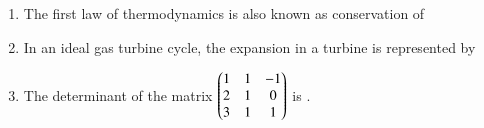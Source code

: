 \documentclass[journal,12pt,onecolumn]{IEEEtran}
\theoremstyle{remark}
\begin{document}
\begin{enumerate}
    [r] Closed-section box beam configuration is capable of resisting torsional loads.
    \hfill{}

    \begin{enumerate}
        \item Both [a] and [r] are true and [r] is the correct reason for [a].
        \item Both [a] and [r] are true but [r] is not the correct reason for [a].
        \item Both [a] and [r] are false.
        \item [a] is true but [r] is false.
    \end{enumerate}

    \item The first law of thermodynamics is also known as conservation of
    \hfill{}

    \begin{enumerate}
    \end{enumerate}

    \item In an ideal gas turbine cycle, the expansion in a turbine is represented by
    \hfill{}

    \begin{enumerate}
    \end{enumerate}

    \item The determinant of the matrix $\begin{pmatrix}1 & 1 & -1 \\ 2 & 1 & 0 \\ 3 & 1 & 1\end{pmatrix}$ is \underline{\hspace{2cm}} .
    \hfill{}


\end{enumerate}
\end{document}
